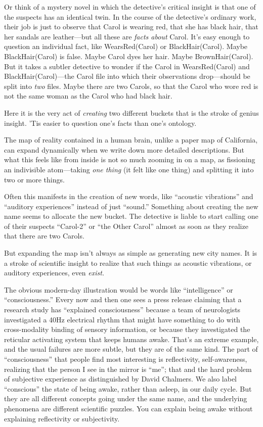 {
 Or think of a mystery novel in which the
detective's critical insight is that one of the
suspects has an identical twin. In the course of the
detective's ordinary work, their job is just to observe
that Carol is wearing red, that she has black hair, that her sandals
are leather---but all these are \textit{facts about} Carol.
It's easy enough to question an individual fact, like
WearsRed(Carol) or BlackHair(Carol). Maybe BlackHair(Carol) is false.
Maybe Carol dyes her hair. Maybe BrownHair(Carol). But it takes a
subtler detective to wonder if the Carol in WearsRed(Carol) and
BlackHair(Carol)---the Carol file into which their observations
drop---should be split into \textit{two} files. Maybe there are two
Carols, so that the Carol who wore red is not the same woman as the
Carol who had black hair.}

{
 Here it is the very act of \textit{creating} two different buckets
that is the stroke of genius insight. 'Tis easier to
question one's facts than one's
ontology.}

{
 The map of reality contained in a human brain, unlike a paper map
of California, can expand dynamically when we write down more detailed
descriptions. But what this feels like from inside is not so much
zooming in on a map, as fissioning an indivisible atom---taking
\textit{one thing} (it felt like one thing) and splitting it into two
or more things.}

{
 Often this manifests in the creation of new words, like
``acoustic vibrations'' and
``auditory experiences'' instead of
just ``sound.'' Something about
creating the new name seems to allocate the new bucket. The detective
is liable to start calling one of their suspects
``Carol-2'' or
``the Other Carol'' almost as soon
as they realize that there are two Carols.}

{
 But expanding the map isn't always as simple as
generating new city names. It is a stroke of scientific insight to
realize that such things as acoustic vibrations, or auditory
experiences, even \textit{exist.}}

{
 The obvious modern-day illustration would be words like
``intelligence'' or
``consciousness.'' Every now and
then one sees a press release claiming that a research study has
``explained consciousness'' because
a team of neurologists investigated a 40Hz electrical rhythm that might
have something to do with cross-modality binding of sensory
information, or because they investigated the reticular activating
system that keeps humans awake. That's an extreme
example, and the usual failures are more subtle, but they are of the
same kind. The part of
``consciousness'' that people find
most interesting is reflectivity, self-awareness, realizing that the
person I see in the mirror is
``me''; that and the hard problem of
subjective experience as distinguished by David Chalmers. We also label
``conscious'' the state of being
awake, rather than asleep, in our daily cycle. But they are all
different concepts going under the same name, and the underlying
phenomena are different scientific puzzles. You can explain being awake
without explaining reflectivity or subjectivity.}


